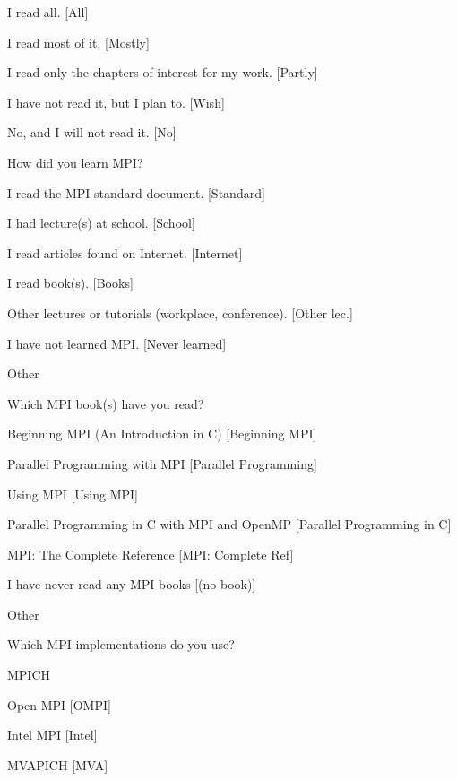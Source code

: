 \documentclass[preprint,5p,times]{elsarticle}
\begin{document}
{\begin{description}
\begin{inparaenum}[{\bf C}1)]
    \item I read all. [All]
    \item I read most of it. [Mostly]
    \item I read only the chapters of interest for my work. [Partly]
    \item I have not read it, but I plan to. [Wish]
    \item No, and I will not read it. [No]
    \end{inparaenum}
  \item[Q10*:] How did you learn MPI?
    \begin{inparaenum}[{\bf C}1)]
    \item I read the MPI standard document. [Standard]
    \item I had lecture(s) at school. [School]
    \item I read articles found on Internet. [Internet]
    \item I read book(s). [Books]
    \item Other lectures or tutorials (workplace, conference). [Other lec.]
    \item I have not learned MPI. [Never learned]
    \item Other
    \end{inparaenum}
  \item[Q11*:] Which MPI book(s) have you read?
    \begin{inparaenum}[{\bf C}1)]
    \item Beginning MPI (An Introduction in C) [Beginning MPI]
    \item Parallel Programming with MPI [Parallel Programming]
    \item Using MPI [Using MPI]
    \item Parallel Programming in C with MPI and OpenMP [Parallel
      Programming in C]
    \item MPI: The Complete Reference [MPI: Complete Ref]
    \item I have never read any MPI books [(no book)]
    \item Other
    \end{inparaenum}
  \item[Q12*:] Which MPI implementations do you use?
    \begin{inparaenum}[{\bf C}1)]
    \item MPICH
    \item Open MPI [OMPI]
    \item Intel MPI [Intel]
    \item MVAPICH [MVA]

\end{inparaenum}
\end{description}}
\end{document}
